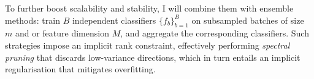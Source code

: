\documentclass{article}
\begin{document}
 To further boost scalability and stability, I will combine them with {ensemble methods}: train \(B\) independent classifiers \(\{f_b\}_{b=1}^B\) on subsampled batches of size \(m\) and or feature dimension \(M\), and aggregate the corresponding classifiers.
 Such  strategies impose an implicit rank constraint, effectively performing \emph{spectral pruning} that discards low-variance directions, which in turn entails an implicit regularisation that mitigates overfitting. 


\end{document}
